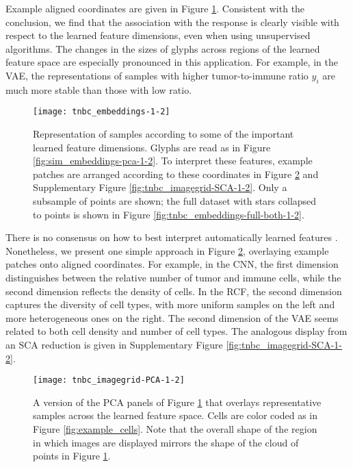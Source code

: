 Example aligned coordinates are given in Figure
\ref{fig:tnbc_embeddings-1-2}. Consistent with the conclusion, we find that
the association with the response is clearly visible with respect to the learned
feature dimensions, even when using unsupervised algorithms. The changes in the
sizes of glyphs across regions of the learned feature space are especially
pronounced in this application. For example, in the VAE, the representations of
samples with higher tumor-to-immune ratio $y_i$ are much more stable than those
with low ratio.

\begin{figure}
  \centering
  \texttt{[image: tnbc\_embeddings-1-2]}
  \caption{Representation of samples according to some of the important learned
    feature dimensions. Glyphs are read as in Figure
    \ref{fig:sim_embeddings-pca-1-2}. To interpret these features, example
    patches are arranged according to these coordinates in Figure
    \ref{fig:tnbc_imagegrid-PCA-1-2} and Supplementary Figure
    \ref{fig:tnbc_imagegrid-SCA-1-2}. Only a subsample of points are shown; the
    full dataset with stars collapsed to points is shown in Figure
    \ref{fig:tnbc_embeddings-full-both-1-2}.}
  \label{fig:tnbc_embeddings-1-2}
\end{figure}

There is no consensus on how to best interpret automatically learned features
\citep{doshi2017towards}. Nonetheless, we present one simple approach in Figure
\ref{fig:tnbc_imagegrid-PCA-1-2}, overlaying example patches onto aligned
coordinates. For example, in the CNN, the first dimension distinguishes between
the relative number of tumor and immune cells, while the second dimension
reflects the density of cells. In the RCF, the second dimension captures the
diversity of cell types, with more uniform samples on the left and more
heterogeneous ones on the right. The second dimension of the VAE seems related
to both cell density and number of cell types. The analogous display from an SCA
reduction is given in Supplementary Figure \ref{fig:tnbc_imagegrid-SCA-1-2}.

\begin{figure}
  \centering
  \texttt{[image: tnbc\_imagegrid-PCA-1-2]}
  \caption{A version of the PCA panels of Figure \ref{fig:tnbc_embeddings-1-2}
    that overlays representative samples across the learned feature space. Cells
    are color coded as in Figure \ref{fig:example_cells}. Note that the overall
    shape of the region in which images are displayed mirrors the shape of the
    cloud of points in Figure \ref{fig:tnbc_embeddings-1-2}.}
  \label{fig:tnbc_imagegrid-PCA-1-2}
\end{figure}
